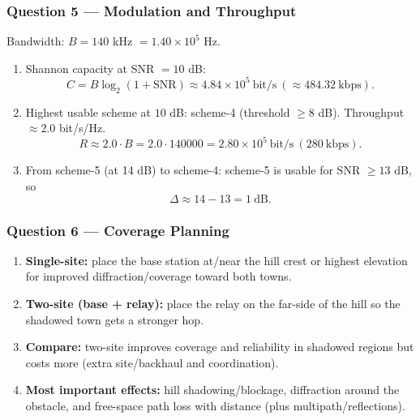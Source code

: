 \documentclass[11pt,a4paper]{article}
\begin{document}
\subsubsection*{Question 5 --- Modulation and Throughput}
Bandwidth: $B=140$ kHz $=1.40\times 10^5$ Hz.

\begin{enumerate}[label=\alph*.]
    \item Shannon capacity at SNR $=10$ dB:
    \[
    C=B\log_2(1+\mathrm{SNR})\approx 4.84\times 10^5\ \text{bit/s}\ (\approx 484.32\ \text{kbps}).
    \]
    \item Highest usable scheme at $10$ dB: scheme-4 (threshold $\ge 8$ dB). Throughput $\approx 2.0$ bit/s/Hz.
    \[
    R\approx 2.0\cdot B=2.0\cdot 140000=2.80\times 10^5\ \text{bit/s}\ (280\ \text{kbps}).
    \]
    \item From scheme-5 (at 14 dB) to scheme-4:
    scheme-5 is usable for SNR $\ge 13$ dB, so
    \[
    \Delta \approx 14-13=1\ \text{dB}.
    \]
\end{enumerate}

\subsubsection*{Question 6 --- Coverage Planning}
\begin{enumerate}[label=\alph*.]
    \item \textbf{Single-site:} place the base station at/near the hill crest or highest elevation for improved diffraction/coverage toward both towns.
    \item \textbf{Two-site (base + relay):} place the relay on the far-side of the hill so the shadowed town gets a stronger hop.
    \item \textbf{Compare:} two-site improves coverage and reliability in shadowed regions but costs more (extra site/backhaul and coordination).
    \item \textbf{Most important effects:} hill shadowing/blockage, diffraction around the obstacle, and free-space path loss with distance (plus multipath/reflections).
    
\end{enumerate}
\end{document}
